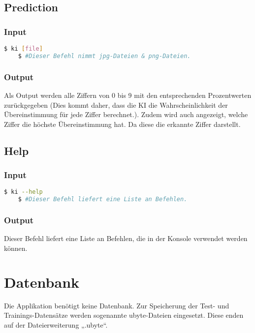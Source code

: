 \subsection{Prediction}
\label{sec:DesignAnwendung}
\subsubsection{Input}
\label{sec:DesignUseInput}
\begin{lstlisting}[language=bash]
	$ ki [file]
	$ #Dieser Befehl nimmt jpg-Dateien & png-Dateien.
\end{lstlisting}

\subsubsection{Output}
\label{sec:DesignUseOutput}
Als Output werden alle Ziffern von 0 bis 9 mit den entsprechenden Prozentwerten zurückgegeben (Dies kommt daher, dass die KI die Wahrscheinlichkeit der Übereinstimmung für jede Ziffer berechnet.). Zudem wird auch angezeigt, welche Ziffer die höchste Übereinstimmung hat. Da diese die erkannte Ziffer darstellt.

\subsection{Help}
\label{sec:DesignHelp}
\subsubsection{Input}
\label{sec:DesignHelpInput}
\begin{lstlisting}[language=bash]
	$ ki --help
	$ #Dieser Befehl liefert eine Liste an Befehlen.
\end{lstlisting}

\subsubsection{Output}
\label{sec:DesignHelpOutput}
Dieser Befehl liefert eine Liste an Befehlen, die in der Konsole verwendet werden können.

\section{Datenbank}
\label{sec:DesignDatenbank}
Die Applikation benötigt keine Datenbank. Zur Speicherung der Test- und Trainings-Datensätze werden sogenannte ubyte-Dateien eingesetzt. Diese enden auf der Dateierweiterung „.ubyte“.

